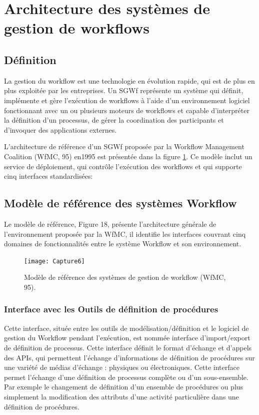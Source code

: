 \section{Architecture des systèmes de gestion de workflows }
\subsection{Définition }
La gestion du workflow est une technologie en évolution rapide, qui est de plus en plus exploitée par les entreprises. Un SGWf représente un système qui définit, implémente et gère l'exécution de workflows à l'aide d'un environnement logiciel fonctionnant avec un ou plusieurs moteurs de workflows et capable d'interpréter la définition d'un processus, de gérer la coordination des participants et d'invoquer des applications externes.  

 L'architecture de référence d’un SGWf proposée par la Workflow Management Coalition (WfMC, 95) en1995 est présentée dans la figure \ref{fig:capture6}. Ce modèle inclut un service de déploiement, qui contrôle l'exécution des workflows et qui supporte cinq interfaces standardisées:
 
 \subsection{Modèle de référence des systèmes Workflow }
 
 Le modèle de référence, Figure 18, présente l’architecture générale de l’environnement
 proposée par la WfMC, il identifie les interfaces couvrant cinq domaines de fonctionnalités entre le système Workflow et son environnement. 
 
\begin{figure}[!h]
	\centering
	\texttt{[image: Capture6]}
	\caption{ Modèle de référence des systèmes de gestion de workflow (WfMC, 95). }
	\label{fig:capture6}
\end{figure}


\subsubsection{Interface avec les Outils de définition de procédures }
Cette interface, située entre les outils de modélisation/définition et le logiciel de gestion
du Workflow pendant l’exécution, est nommée interface d’import/export de définition de processus. Cette interface définit le format d’échange et d’appels des APIs, qui permettent
l'échange d'informations de définition de procédures sur une variété de médias d'échange :
physiques ou électroniques. Cette interface permet l'échange d'une définition de processus
complète ou d’un sous-ensemble. Par exemple le changement de définition d’un ensemble de
procédures ou plus simplement la modification des attributs d'une activité particulière dans
une définition de procédures. 

